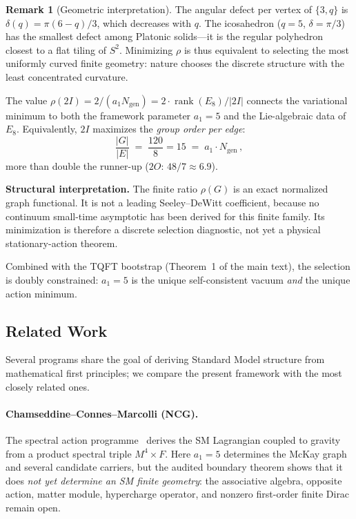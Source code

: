 \documentclass[12pt,a4paper]{article}
\theoremstyle{definition}
\newtheorem{remark}{Remark}
\begin{document}
\begin{remark}[Geometric interpretation]
The angular defect per vertex of $\{3,q\}$ is $\delta(q) = \pi(6-q)/3$, which decreases with $q$.  The icosahedron ($q = 5$, $\delta = \pi/3$) has the smallest defect among Platonic solids---it is the regular polyhedron closest to a flat tiling of $S^2$.  Minimizing $\rho$ is thus equivalent to selecting the most uniformly curved finite geometry: nature chooses the discrete structure with the least concentrated curvature.
\end{remark}

\noindent The value $\rho(2I) = 2/(a_1 N_{\mathrm{gen}}) = 2 \cdot \operatorname{rank}(E_8)/|2I|$ connects the variational minimum to both the framework parameter $a_1 = 5$ and the Lie-algebraic data of $E_8$.  Equivalently, $2I$ maximizes the \emph{group order per edge}:
\[
\frac{|G|}{|E|} \;=\; \frac{120}{8} = 15 \;=\; a_1 \cdot N_{\mathrm{gen}}\,,
\]
more than double the runner-up ($2O$: $48/7 \approx 6.9$).

\textbf{Structural interpretation.}  The finite ratio $\rho(G)$ is an exact
normalized graph functional.  It is not a leading Seeley--DeWitt coefficient,
because no continuum small-time asymptotic has been derived for this finite
family.  Its minimization is therefore a discrete selection diagnostic, not
yet a physical stationary-action theorem.

Combined with the TQFT bootstrap (Theorem~1 of the main text), the selection is doubly constrained: $a_1 = 5$ is the unique self-consistent vacuum \emph{and} the unique action minimum.

\subsection{Related Work}

Several programs share the goal of deriving Standard Model structure from mathematical first principles; we compare the present framework with the most closely related ones.

\paragraph{Chamseddine--Connes--Marcolli (NCG).}
The spectral action programme~\cite{chamseddine1997,ccm2007} derives the SM Lagrangian coupled to gravity from a product spectral triple $M^4\times F$.  Here $a_1=5$ determines the McKay graph and several candidate carriers, but the audited boundary theorem shows that it does \emph{not yet determine an SM finite geometry}: the associative algebra, opposite action, matter module, hypercharge operator, and nonzero first-order finite Dirac remain open.
\end{document}
